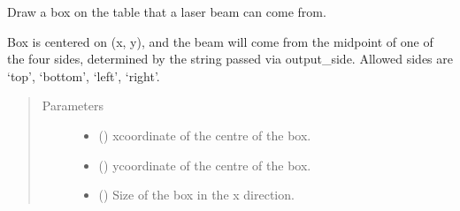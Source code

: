 \documentclass[letterpaper,10pt,english]{sphinxmanual}
\begin{document}
\begin{fulllineitems}
\begin{fulllineitems}
\begin{quote}
\begin{description}
\begin{itemize}
\end{itemize}


\end{description}\end{quote}

\end{fulllineitems}


\begin{fulllineitems}
\label{\detokenize{index:pyopticaltable.OpticalTable.box_source}}
\sphinxAtStartPar
Draw a box on the table that a laser beam can come from.

\sphinxAtStartPar
Box is centered on (x, y), and the beam will come from the midpoint of
one of the four sides, determined by the string passed via output\_side.
Allowed sides are ‘top’, ‘bottom’, ‘left’, ‘right’.
\begin{quote}\begin{description}
\item[{Parameters}] \leavevmode\begin{itemize}
\item {} 
\sphinxAtStartPar
{} () \textendash{} x\sphinxhyphen{}coordinate of the centre of the box.

\item {} 
\sphinxAtStartPar
{} () \textendash{} y\sphinxhyphen{}coordinate of the centre of the box.

\item {} 
\sphinxAtStartPar
{} () \textendash{} Size of the box in the x direction.


\end{itemize}
\end{description}
\end{quote}
\end{fulllineitems}
\end{fulllineitems}
\end{document}
